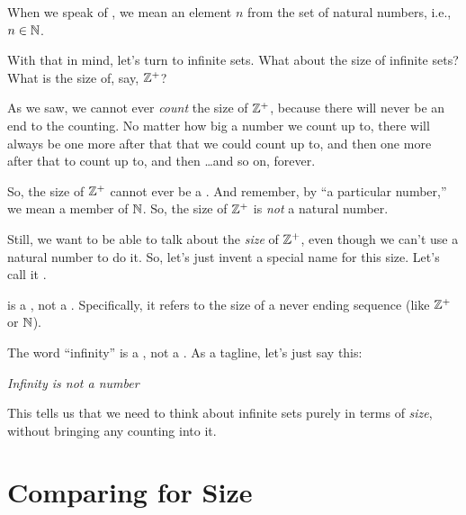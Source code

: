 \documentclass[../../../main.tex]{subfiles}
\begin{document}
\begin{fdefinition}
  When we speak of , we mean an element $n$ from the set of natural numbers, i.e., $n \in \Nats/$.
\end{fdefinition}

With that in mind, let's turn to infinite sets. What about the size of infinite sets? What is the size of, say, $\PositiveInts/$? 

As we saw, we cannot ever \emph{count} the size of $\PositiveInts/$, because there will never be an end to the counting. No matter how big a number we count up to, there will always be one more after that that we could count up to, and then one more after that to count up to, and then \ldots and so on, forever.

So, the size of $\PositiveInts/$ cannot ever be a . And remember, by ``a particular number,'' we mean a member of $\Nats/$. So, the size of $\PositiveInts/$ is \emph{not} a natural number. 

Still, we want to be able to talk about the \emph{size} of $\PositiveInts/$, even though we can't use a natural number to do it. So, let's just invent a special name for this size. Let's call it . 

\begin{terminology}
   is a , not a . Specifically, it refers to the size of a never ending sequence (like $\PositiveInts/$ or $\Nats/$).
\end{terminology}

The word ``infinity'' is a , not a . As a tagline, let's just say this:

\begin{center}
  \emph{Infinity is not a number}
\end{center}

This tells us that we need to think about infinite sets purely in terms of \emph{size}, without bringing any counting into it. 


\section{Comparing for Size}
\end{document}
